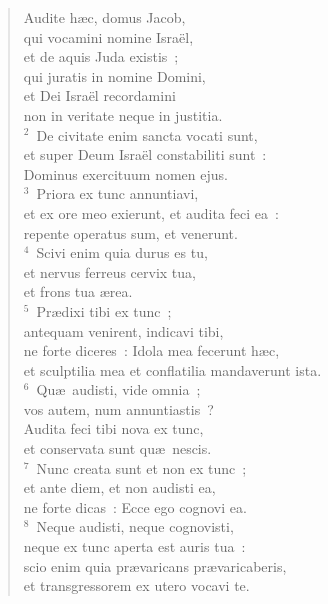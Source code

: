 \begin{flushleft}\begin{verse}\vspace{-19pt}\hspace{6pt}Audite h\ae c, domus Jacob,\\\hspace{6pt} qui vocamini nomine Isra\"el,\\ et de aquis Juda existis~;\\ qui juratis in nomine Domini,\\ et Dei Isra\"el recordamini\\ non in veritate neque in justitia.\\
${}^{2}$~De civitate enim sancta vocati sunt,\\ et super Deum Isra\"el constabiliti sunt~:\\ Dominus exercituum nomen ejus.\\
${}^{3}$~Priora ex tunc annuntiavi,\\ et ex ore meo exierunt, et audita feci ea~:\\ repente operatus sum, et venerunt.\\
${}^{4}$~Scivi enim quia durus es tu,\\ et nervus ferreus cervix tua,\\ et frons tua \ae rea.\\
${}^{5}$~Pr\ae dixi tibi ex tunc~;\\ antequam venirent, indicavi tibi,\\ ne forte diceres~: Idola mea fecerunt h\ae c,\\ et sculptilia mea et conflatilia mandaverunt ista.\\
${}^{6}$~Qu\ae\ audisti, vide omnia~;\\ vos autem, num annuntiastis~?\\ Audita feci tibi nova ex tunc,\\ et conservata sunt qu\ae\ nescis.\\
${}^{7}$~Nunc creata sunt et non ex tunc~;\\ et ante diem, et non audisti ea,\\ ne forte dicas~: Ecce ego cognovi ea.\\
${}^{8}$~Neque audisti, neque cognovisti,\\ neque ex tunc aperta est auris tua~:\\ scio enim quia pr\ae varicans pr\ae varicaberis,\\ et transgressorem ex utero vocavi te.\\

\end{verse}
\end{flushleft}
